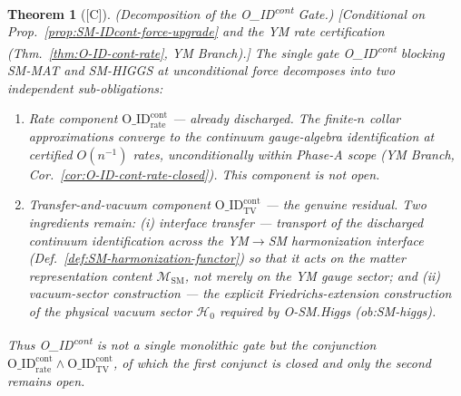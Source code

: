 \documentclass[12pt,oneside]{amsbook}
\theoremstyle{plain}
\newtheorem{theorem}{Theorem}[section]
\theoremstyle{definition}
\theoremstyle{remark}
\newcommand{\status}[1]{\textup{[#1]}}
\begin{document}
\begin{theorem}[\status{C}]\label{thm:SM-IDcont-decomposition}
\textup{(Decomposition of the O\_ID\textsuperscript{cont} Gate.)}
\textup{[Conditional on Prop.~\ref{prop:SM-IDcont-force-upgrade}
and the YM rate certification
(Thm.~\ref{thm:O-ID-cont-rate}, YM Branch).]}
The single gate O\_ID\textsuperscript{cont} blocking SM-MAT and
SM-HIGGS at unconditional force decomposes into two independent
sub-obligations:
\begin{enumerate}[label=\textup{(\Alph*)}]
  \item \emph{Rate component
  $\mathrm{O\_ID}^{\mathrm{cont}}_{\mathrm{rate}}$ ---
  already discharged.} The finite-$n$ collar approximations
  converge to the continuum gauge-algebra identification at
  certified $O(n^{-1})$ rates, unconditionally within Phase-A
  scope (YM Branch,
  Cor.~\ref{cor:O-ID-cont-rate-closed}).  This component is
  \emph{not} open.
  \item \emph{Transfer-and-vacuum component
  $\mathrm{O\_ID}^{\mathrm{cont}}_{\mathrm{TV}}$ ---
  the genuine residual.} Two ingredients remain: (i)
  \emph{interface transfer} --- transport of the discharged
  continuum identification across the YM$\to$SM harmonization
  interface (Def.~\ref{def:SM-harmonization-functor}) so that it
  acts on the matter representation content
  $\mathcal{M}_{\mathrm{SM}}$, not merely on the YM gauge sector;
  and (ii) \emph{vacuum-sector construction} --- the explicit
  Friedrichs-extension construction of the physical vacuum sector
  $\mathcal{H}_0$ required by O-SM.Higgs (ob:SM-higgs).
\end{enumerate}
Thus O\_ID\textsuperscript{cont} is not a single monolithic gate
but the conjunction
$\mathrm{O\_ID}^{\mathrm{cont}}_{\mathrm{rate}} \wedge
\mathrm{O\_ID}^{\mathrm{cont}}_{\mathrm{TV}}$, of which the
first conjunct is closed and only the second remains open.
\end{theorem}
\end{document}
